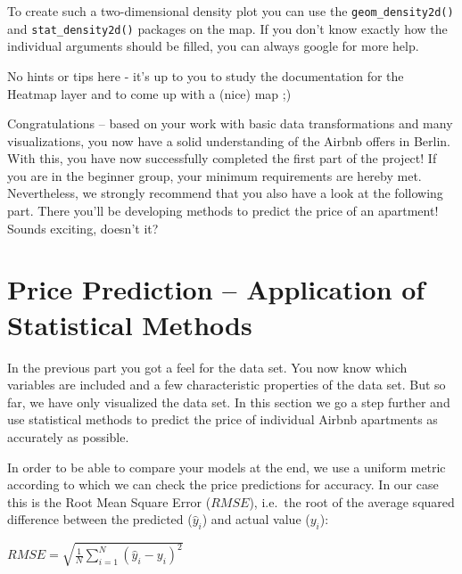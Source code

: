 \documentclass[
  11pt,
]{article}
\newenvironment{tips}[1]
  {
  \begin{itemize}
  \footnotesize
  \renewcommand{\labelitemi}{
    \raisebox{-.7\height}[0pt][0pt]{
      {\setkeys{Gin}{width=3em,keepaspectratio}
        \texttt{[image: images/\#1.png]}}
    }
  }
  \setlength{\fboxsep}{1em}
  \begin{rbox}
  \item
  }
  {
  \end{rbox}
  \end{itemize}
  }
\newenvironment{tipsp}[1]
  {
  \begin{itemize}
  \footnotesize
  \renewcommand{\labelitemi}{
    \raisebox{-.7\height}[0pt][0pt]{
      {\setkeys{Gin}{width=3em,keepaspectratio}
        \texttt{[image: images/\#1.png]}}
    }
  }
  \setlength{\fboxsep}{1em}
  \begin{pbox}
  \item
  }
  {
  \end{pbox}
  \end{itemize}
  }
\begin{document}
\begin{tips}r

To create such a two-dimensional density plot you can use the \texttt{geom\_density2d()} and \texttt{stat\_density2d()} packages on the map. If you don't know exactly how the individual arguments should be filled, you can always google for more help.

\end{tips}

\begin{tipsp}p

No hints or tips here - it's up to you to study the documentation for the Heatmap layer and to come up with a (nice) map ;)

\end{tipsp}

Congratulations -- based on your work with basic data transformations and many visualizations, you now have a solid understanding of the Airbnb offers in Berlin. With this, you have now successfully completed the first part of the project! If you are in the beginner group, your minimum requirements are hereby met. Nevertheless, we strongly recommend that you also have a look at the following part. There you'll be developing methods to predict the price of an apartment! Sounds exciting, doesn't it?

\newpage

\hypertarget{price-prediction-application-of-statistical-methods}{%
\section{Price Prediction -- Application of Statistical Methods}\label{price-prediction-application-of-statistical-methods}}

In the previous part you got a feel for the data set. You now know which variables are included and a few characteristic properties of the data set. But so far, we have only visualized the data set. In this section we go a step further and use statistical methods to predict the price of individual Airbnb apartments as accurately as possible.

In order to be able to compare your models at the end, we use a uniform metric according to which we can check the price predictions for accuracy. In our case this is the Root Mean Square Error (\(RMSE\)), i.e.~the root of the average squared difference between the predicted (\(\hat{y}_i\)) and actual value (\(y_i\)):

\(RMSE = \sqrt{\frac{1}{N}\sum_{i=1}^{N}{(\hat{y}_i-y_i)^2}}\)
\end{document}
